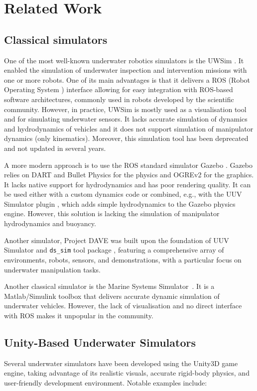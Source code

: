 \section{Related Work}
\subsection{Classical simulators}

One of the most well-known underwater robotics simulators is the UWSim \cite{dhurandher2008uwsim}.  It enabled the simulation of underwater inspection and intervention missions with one or more robots. One of its main advantages is that it delivers a ROS (Robot Operating System \cite{quigley2009ros}) interface allowing for easy integration with ROS-based software architectures, commonly used in robots developed by the scientific community. 
However, in practice, UWSim is mostly used as a visualisation tool and for simulating underwater sensors. It lacks accurate simulation of dynamics and hydrodynamics of vehicles and it does not support simulation of manipulator dynamics (only kinematics). Moreover, this simulation tool has been deprecated and not updated in several years.

A more modern approach is to use the ROS standard simulator Gazebo \cite{gazebo}. Gazebo relies on DART and Bullet Physics for the physics and OGREv2 for the graphics. It lacks native support for hydrodynamics and has poor rendering quality. It can be used either with a custom dynamics code or combined, e.g., with the UUV Simulator plugin \cite{Manhaes_2016}, which adds simple hydrodynamics to the Gazebo physics engine. However, this solution is lacking the simulation of manipulator hydrodynamics and buoyancy. 

Another simulator, Project DAVE \cite{zhang_dave_2022} was built upon the foundation of UUV Simulator \cite{manhaesUUVSimulatorGazebobased2016} and \texttt{ds\_sim} tool package \cite{WhoidslDs_simBitbucket}, featuring a comprehensive array of environments, robots, sensors, and demonstrations, with a particular focus on underwater manipulation tasks.

Another classical simulator is the Marine Systems Simulator~\cite{perez2006overview}. It is a Matlab/Simulink toolbox that delivers accurate dynamic simulation of underwater vehicles. However, the lack of visualisation and no direct interface with ROS makes it unpopular in the community.


\subsection{Unity-Based Underwater Simulators}
Several underwater simulators have been developed using the Unity3D game engine, taking advantage of its realistic visuals, accurate rigid-body physics, and user-friendly development environment. Notable examples include:

